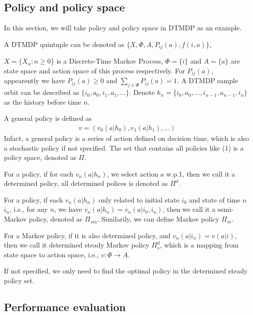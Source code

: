 \documentclass[runningheads]{llncs}
\begin{document}
    \subsection{Policy and policy space}
    In this section, we will take policy and policy space in DTMDP as an example.
    \par
    A DTMDP quintuple can be denoted as $\{ X, \Phi, A, P_{ij}(a), f(i, a) \}$,
    \par\noindent
    $X = \{ X_n; n \geq 0 \}$ is a Discrete-Time Markov Process, $\Phi = \{i \}$
    and $A = \{ a \}$ are state space and action space of this process respectively.
    For $P_{ij}(a)$, appearently we have $P_{ij}(a) \geq 0$ and
    $\sum_{j \in \Phi} P_{ij}(a) = 1$.
    A DTMDP sample orbit can be described as $\{ i_0, a_0, i_1, a_1,...\}$.
    Denote $h_n = \{ i_0, a_0,...,i_{n-1}, a_{n-1}, i_n \}$ as the history
    before time $n$.
    \par
    A general policy is defined as
    \begin{align}
        v = (v_0(a | h_0), v_1(a | h_1),...)    
    \end{align}
    Infact, a general policy is a series of action defined on decision time,
    which is also a stochastic policy if not specified.
    The set that contains all policies like (1) is a policy space, denoted as $\Pi$.
    \par
    For a policy, if for each $v_n(a|h_n)$, we select action $a$ w.p.1, then we call it
    a determined policy, all determined polices is denoted as $\Pi^d$.
    \par
    For a policy, if each $v_n(a|h_n)$ only related to initial state $i_0$ and state
    of time $n$ $i_n$, i.e., for any $n$, we have $v_n(a|h_n) = v_n(a|i_0, i_n)$,
    then we call it a semi-Markov policy, denoted as $\Pi_{sm}$.
    Similarily, we can define Markov policy $\Pi_m$.
    \par
    For a Markov policy, if it is also determined policy, and $v_n(a|i_n) = v(a|i)$,
    then we call it determined steady Markov policy $\Pi_s^d$,
    which is a mapping from state space to action space, i.e., $v: \Phi \rightarrow A$.
    \par
    If not specified, we only need to find the optimal policy in the determined steady
    policy set.

    \subsection{Performance evaluation}
\end{document}
